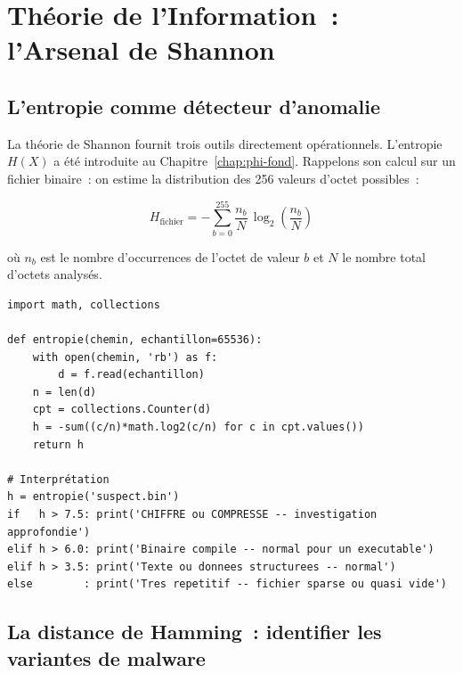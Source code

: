 \section{Théorie de l'Information~: l'Arsenal de Shannon}
\label{sec:shannon-arsenal}

\subsection{L'entropie comme détecteur d'anomalie}

La théorie de Shannon \cite{shannon1948} fournit trois outils directement
opérationnels. L'entropie $H(X)$ a été introduite au Chapitre~\ref{chap:phi-fond}.
Rappelons son calcul sur un fichier binaire~: on estime la distribution des
256 valeurs d'octet possibles~:

\begin{equation}
H_{\text{fichier}} = -\sum_{b=0}^{255}
\frac{n_b}{N}\,\log_2\!\left(\frac{n_b}{N}\right)
\label{eq:shannon-fichier}
\end{equation}

où $n_b$ est le nombre d'occurrences de l'octet de valeur $b$ et $N$ le nombre
total d'octets analysés.

\begin{lstlisting}[language=bash_forensique,
    caption={Calcul de l'entropie d'un fichier --- script Python forensique}]
import math, collections

def entropie(chemin, echantillon=65536):
    with open(chemin, 'rb') as f:
        d = f.read(echantillon)
    n = len(d)
    cpt = collections.Counter(d)
    h = -sum((c/n)*math.log2(c/n) for c in cpt.values())
    return h

# Interprétation
h = entropie('suspect.bin')
if   h > 7.5: print('CHIFFRE ou COMPRESSE -- investigation approfondie')
elif h > 6.0: print('Binaire compile -- normal pour un executable')
elif h > 3.5: print('Texte ou donnees structurees -- normal')
else        : print('Tres repetitif -- fichier sparse ou quasi vide')
\end{lstlisting}

\subsection{La distance de Hamming~: identifier les variantes de malware}

